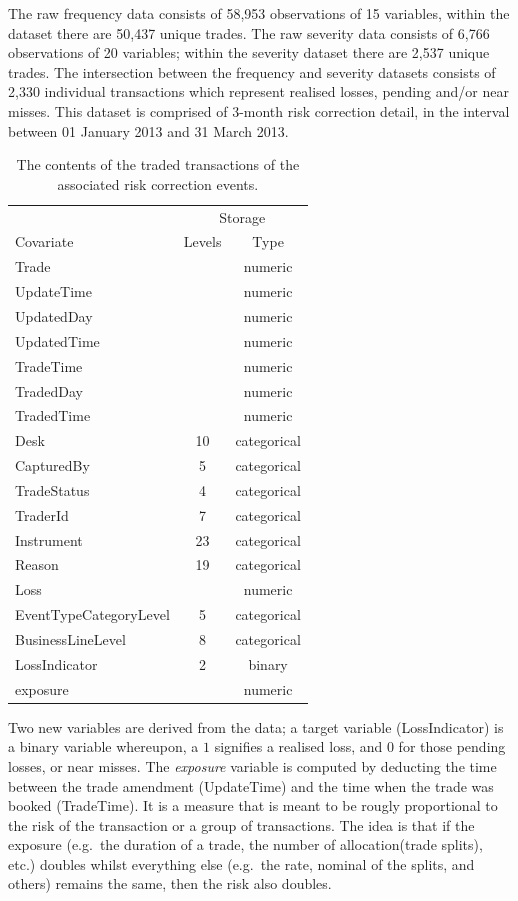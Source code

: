 \documentclass[]{article}
\begin{document}
The raw frequency data consists of 58,953 observations of 15 variables,
within the dataset there are 50,437 unique trades. The raw severity data
consists of 6,766 observations of 20 variables; within the severity
dataset there are 2,537 unique trades. The intersection between the
frequency and severity datasets consists of 2,330 individual
transactions which represent realised losses, pending and/or near
misses. This dataset is comprised of 3-month risk correction detail, in
the interval between 01 January 2013 and 31 March 2013. \medskip

\begin{table}[ht]
\centering
\caption{The contents of the traded transactions of the associated risk correction events.}
\begin{tabular}{lcc}
\toprule
  & \multicolumn{2}{c}{Storage} \\
Covariate     & Levels   & Type \\ 
\midrule
 Trade       &          & numeric \\
 UpdateTime  &          & numeric \\
 UpdatedDay  &          & numeric \\
 UpdatedTime &          & numeric \\
 TradeTime   &          & numeric \\
 TradedDay   &          & numeric \\
 TradedTime  &          & numeric \\
 Desk        &  10      & categorical \\
 CapturedBy  &  5       & categorical \\
 TradeStatus &  4       & categorical \\
 TraderId    &  7       & categorical \\
 Instrument  &  23      & categorical \\
 Reason      &  19      & categorical \\
 Loss        &          & numeric \\
 EventTypeCategoryLevel & 5  & categorical \\
 BusinessLineLevel      & 8  & categorical \\
 LossIndicator          & 2  & binary \\
 exposure               &    & numeric \\
 \bottomrule
\end{tabular}\label{tab_contents}
\end{table}

Two new variables are derived from the data; a target variable
(LossIndicator) is a binary variable whereupon, a \(1\) signifies a
realised loss, and \(0\) for those pending losses, or near misses. The
\emph{exposure} variable is computed by deducting the time between the
trade amendment (UpdateTime) and the time when the trade was booked
(TradeTime). It is a measure that is meant to be rougly proportional to
the risk of the transaction or a group of transactions. The idea is that
if the exposure (e.g.~the duration of a trade, the number of
allocation(trade splits), etc.) doubles whilst everything else (e.g.~the
rate, nominal of the splits, and others) remains the same, then the risk
also doubles.\medskip
\end{document}

